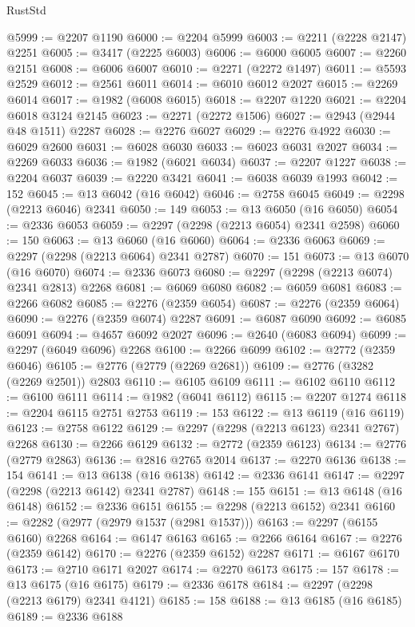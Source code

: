\begin{lexlean}{RustStd}
\begin{coremodule}
@5999 := @2207 @1190
@6000 := @2204 @5999
@6003 := @2211 (@2228 @2147) @2251
@6005 := @3417 (@2225 @6003)
@6006 := @6000 @6005
@6007 := @2260 @2151
@6008 := @6006 @6007
@6010 := @2271 (@2272 @1497)
@6011 := @5593 @2529
@6012 := @2561 @6011
@6014 := @6010 @6012 @2027
@6015 := @2269 @6014
@6017 := @1982 (@6008 @6015)
@6018 := @2207 @1220
@6021 := @2204 @6018 @3124 @2145
@6023 := @2271 (@2272 @1506)
@6027 := @2943 (@2944 @48 @1511) @2287
@6028 := @2276 @6027
@6029 := @2276 @4922
@6030 := @6029 @2600
@6031 := @6028 @6030
@6033 := @6023 @6031 @2027
@6034 := @2269 @6033
@6036 := @1982 (@6021 @6034)
@6037 := @2207 @1227
@6038 := @2204 @6037
@6039 := @2220 @3421
@6041 := @6038 @6039 @1993
@6042 := 152
@6045 := @13 @6042 (@16 @6042)
@6046 := @2758 @6045
@6049 := @2298 (@2213 @6046) @2341
@6050 := 149
@6053 := @13 @6050 (@16 @6050)
@6054 := @2336 @6053
@6059 := @2297 (@2298 (@2213 @6054) @2341 @2598)
@6060 := 150
@6063 := @13 @6060 (@16 @6060)
@6064 := @2336 @6063
@6069 := @2297 (@2298 (@2213 @6064) @2341 @2787)
@6070 := 151
@6073 := @13 @6070 (@16 @6070)
@6074 := @2336 @6073
@6080 := @2297 (@2298 (@2213 @6074) @2341 @2813) @2268
@6081 := @6069 @6080
@6082 := @6059 @6081
@6083 := @2266 @6082
@6085 := @2276 (@2359 @6054)
@6087 := @2276 (@2359 @6064)
@6090 := @2276 (@2359 @6074) @2287
@6091 := @6087 @6090
@6092 := @6085 @6091
@6094 := @4657 @6092 @2027
@6096 := @2640 (@6083 @6094)
@6099 := @2297 (@6049 @6096) @2268
@6100 := @2266 @6099
@6102 := @2772 (@2359 @6046)
@6105 := @2776 (@2779 (@2269 @2681))
@6109 := @2776 (@3282 (@2269 @2501)) @2803
@6110 := @6105 @6109
@6111 := @6102 @6110
@6112 := @6100 @6111
@6114 := @1982 (@6041 @6112)
@6115 := @2207 @1274
@6118 := @2204 @6115 @2751 @2753
@6119 := 153
@6122 := @13 @6119 (@16 @6119)
@6123 := @2758 @6122
@6129 := @2297 (@2298 (@2213 @6123) @2341 @2767) @2268
@6130 := @2266 @6129
@6132 := @2772 (@2359 @6123)
@6134 := @2776 (@2779 @2863)
@6136 := @2816 @2765 @2014
@6137 := @2270 @6136
@6138 := 154
@6141 := @13 @6138 (@16 @6138)
@6142 := @2336 @6141
@6147 := @2297 (@2298 (@2213 @6142) @2341 @2787)
@6148 := 155
@6151 := @13 @6148 (@16 @6148)
@6152 := @2336 @6151
@6155 := @2298 (@2213 @6152) @2341
@6160 := @2282 (@2977 (@2979 @1537 (@2981 @1537)))
@6163 := @2297 (@6155 @6160) @2268
@6164 := @6147 @6163
@6165 := @2266 @6164
@6167 := @2276 (@2359 @6142)
@6170 := @2276 (@2359 @6152) @2287
@6171 := @6167 @6170
@6173 := @2710 @6171 @2027
@6174 := @2270 @6173
@6175 := 157
@6178 := @13 @6175 (@16 @6175)
@6179 := @2336 @6178
@6184 := @2297 (@2298 (@2213 @6179) @2341 @4121)
@6185 := 158
@6188 := @13 @6185 (@16 @6185)
@6189 := @2336 @6188

\end{coremodule}
\end{lexlean}
